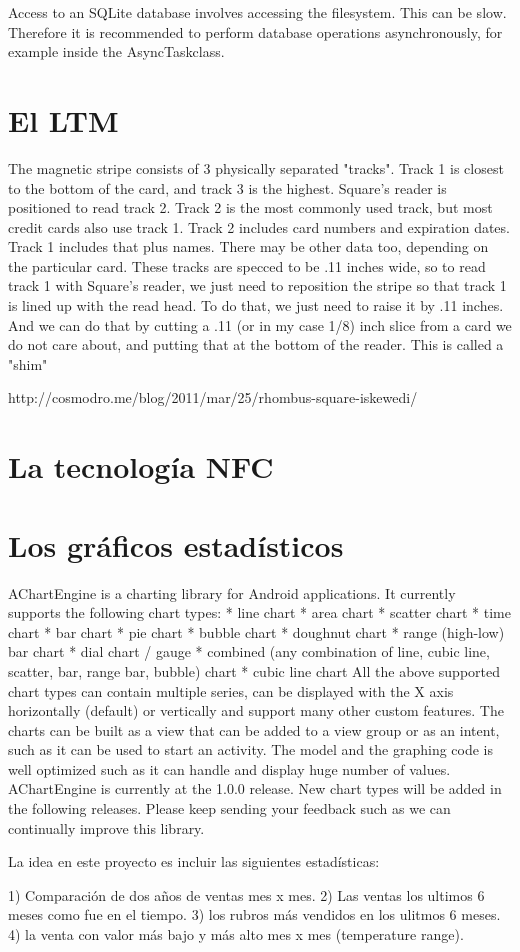 Access to an SQLite database involves accessing the filesystem. This can be slow. Therefore it is recommended to perform database operations asynchronously, for example inside the AsyncTaskclass.

\section{El \ac{LTM}}
\label{sec:tpv.ltm}

The magnetic stripe consists of 3 physically separated "tracks". Track 1 is closest to the bottom of the card, and track 3 is the highest. Square's reader is positioned to read track 2. Track 2 is the most commonly used track, but most credit cards also use track 1. Track 2 includes card numbers and expiration dates. Track 1 includes that plus names. There may be other data too, depending on the particular card. These tracks are specced to be .11 inches wide, so to read track 1 with Square's reader, we just need to reposition the stripe so that track 1 is lined up with the read head. To do that, we just need to raise it by .11 inches. And we can do that by cutting a .11 (or in my case 1/8) inch slice from a card we do not care about, and putting that at the bottom of the reader. This is called a "shim"

http://cosmodro.me/blog/2011/mar/25/rhombus-square-iskewedi/


\section{La tecnolog\'ia \ac{NFC}}
\label{sec:tpv.nfc}


\section{Los gr\'aficos estad\'isticos}
\label{sec:tpv.graphs}

AChartEngine is a charting library for Android applications. It currently supports the following chart types:
   * line chart
   * area chart
   * scatter chart
   * time chart
   * bar chart
   * pie chart
   * bubble chart
   * doughnut chart
   * range (high-low) bar chart
   * dial chart / gauge
   * combined (any combination of line, cubic line, scatter, bar, range bar, bubble) chart
   * cubic line chart
All the above supported chart types can contain multiple series, can be displayed with the X axis horizontally (default) or vertically and support many other custom features. The charts can be built as a view that can be added to a view group or as an intent, such as it can be used to start an activity.
The model and the graphing code is well optimized such as it can handle and display huge number of values.
AChartEngine is currently at the 1.0.0 release. New chart types will be added in the following releases. Please keep sending your feedback such as we can continually improve this library.

La idea en este proyecto es incluir las siguientes estadísticas:

1) Comparaci\'on de dos años de ventas mes x mes.
2) Las ventas los ultimos 6 meses como fue en el tiempo.
3) los rubros más vendidos en los ulitmos 6 meses.
4) la venta con valor más bajo y más alto mes x mes (temperature range).
